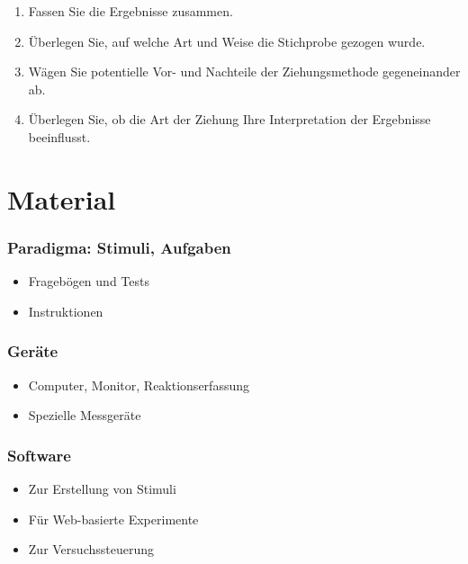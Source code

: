 \documentclass[
]{book}
\begin{document}
\begin{enumerate}
\def\labelenumi{\arabic{enumi}.}
\item
  Fassen Sie die Ergebnisse zusammen.
\item
  Überlegen Sie, auf welche Art und Weise die Stichprobe gezogen wurde.
\item
  Wägen Sie potentielle Vor- und Nachteile der Ziehungsmethode gegeneinander ab.
\item
  Überlegen Sie, ob die Art der Ziehung Ihre Interpretation der Ergebnisse beeinflusst.
\end{enumerate}

\hypertarget{material}{%
\section{Material}\label{material}}

\hypertarget{paradigma-stimuli-aufgaben}{%
\subsubsection{Paradigma: Stimuli, Aufgaben}\label{paradigma-stimuli-aufgaben}}

\begin{itemize}
\item
  Fragebögen und Tests
\item
  Instruktionen
\end{itemize}

\hypertarget{geruxe4te}{%
\subsubsection{Geräte}\label{geruxe4te}}

\begin{itemize}
\item
  Computer, Monitor, Reaktionserfassung
\item
  Spezielle Messgeräte
\end{itemize}

\hypertarget{software}{%
\subsubsection{Software}\label{software}}

\begin{itemize}
\item
  Zur Erstellung von Stimuli
\item
  Für Web-basierte Experimente
\item
  Zur Versuchssteuerung
\end{itemize}
\end{document}
